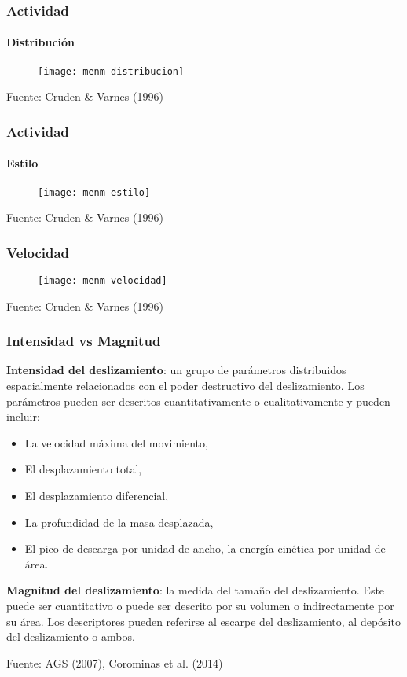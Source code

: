 \documentclass[12pt]{beamer}
\begin{document}
\begin{frame}
\frametitle{Actividad}
\framesubtitle{Distribución}
\begin{figure}
\centering
\texttt{[image: menm-distribucion]} 
\end{figure}
\tiny{Fuente: Cruden \& Varnes (1996)}
\end{frame}
\begin{frame}
\frametitle{Actividad}
\framesubtitle{Estilo}
\begin{figure}
\centering
\texttt{[image: menm-estilo]} 
\end{figure}
\tiny{Fuente: Cruden \& Varnes (1996)}
\end{frame}
\begin{frame}
\frametitle{Velocidad}
\begin{figure}
\centering
\texttt{[image: menm-velocidad]} 
\end{figure}
\tiny{Fuente: Cruden \& Varnes (1996)}
\end{frame}
\begin{frame}
\frametitle{Intensidad vs Magnitud}
\scriptsize{
\textbf{Intensidad del deslizamiento}: un grupo de parámetros distribuidos espacialmente relacionados con el poder destructivo del deslizamiento. Los parámetros pueden ser descritos cuantitativamente o cualitativamente y pueden incluir:
\vfill
\begin{itemize}
\item La velocidad máxima del movimiento,
\item El desplazamiento total,
\item El desplazamiento diferencial,
\item La profundidad de la masa desplazada,
\item El pico de descarga por unidad de ancho, la energía cinética por unidad de área.
\end{itemize}
\vfill
\textbf{Magnitud del deslizamiento}: la medida del tamaño del deslizamiento. Este puede ser cuantitativo o puede ser descrito por su volumen o indirectamente por su área. Los descriptores pueden referirse al escarpe del deslizamiento, al depósito del deslizamiento o ambos.
}
\tiny{Fuente: AGS (2007), Corominas et al. (2014)}
\end{frame}
\end{document}
